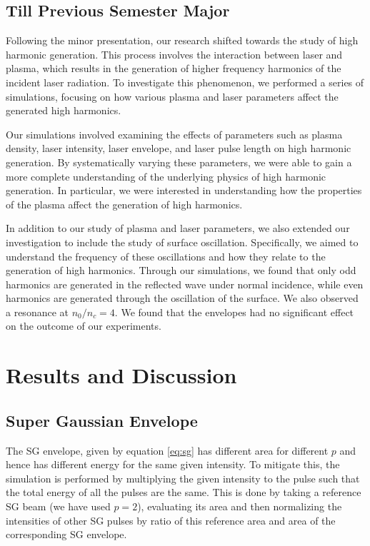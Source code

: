 \documentclass[12pt]{article}
\begin{document}
\subsection{Till Previous Semester Major}
Following the minor presentation, our research shifted towards the study of high harmonic generation. This process involves the interaction between laser and plasma, which results in the generation of higher frequency harmonics of the incident laser radiation. To investigate this phenomenon, we performed a series of simulations, focusing on how various plasma and laser parameters affect the generated high harmonics.

Our simulations involved examining the effects of parameters such as plasma density, laser intensity, laser envelope, and laser pulse length on high harmonic generation. By systematically varying these parameters, we were able to gain a more complete understanding of the underlying physics of high harmonic generation. In particular, we were interested in understanding how the properties of the plasma affect the generation of high harmonics.

In addition to our study of plasma and laser parameters, we also extended our investigation to include the study of surface oscillation. Specifically, we aimed to understand the frequency of these oscillations and how they relate to the generation of high harmonics. Through our simulations, we found that only odd harmonics are generated in the reflected wave under normal incidence, while even harmonics are generated through the oscillation of the surface. We also observed a resonance at $n_0/n_c = 4$. We found that the envelopes had no significant effect on the outcome of our experiments.

\section{Results and Discussion}
\subsection{Super Gaussian Envelope}
The SG envelope, given by equation \ref{eq:sg} has different area for different $p$ and hence has different energy for the same given intensity. To mitigate this, the simulation is performed by multiplying the given intensity to the pulse such that the total energy of all the pulses are the same. This is done by taking a reference SG beam (we have used $p=2$), evaluating its area and then normalizing the intensities of other SG pulses by ratio of this reference area and area of the corresponding SG envelope.
\end{document}

